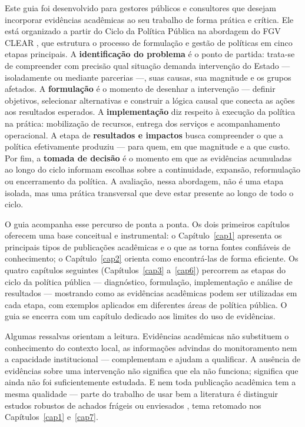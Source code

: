\documentclass[12pt, a4paper, openany]{book}
\begin{document}
Este guia foi desenvolvido para gestores públicos e consultores que desejam
incorporar evidências acadêmicas ao seu trabalho de forma prática e crítica.
Ele está organizado a partir do Ciclo da Política Pública na abordagem do FGV
CLEAR \citep{Lima2025}, que estrutura o processo de formulação e gestão de
políticas em cinco etapas principais. A \textbf{identificação do problema} é o
ponto de partida: trata-se de compreender com precisão qual situação demanda
intervenção do Estado --- isoladamente ou mediante parcerias ---, suas causas,
sua magnitude e os grupos afetados. A \textbf{formulação} é o momento de
desenhar a intervenção --- definir objetivos, selecionar alternativas e
construir a lógica causal que conecta as ações aos resultados esperados. A
\textbf{implementação} diz respeito à execução da política na prática:
mobilização de recursos, entrega dos serviços e acompanhamento operacional. A
etapa de \textbf{resultados e impactos} busca compreender o que a política
efetivamente produziu --- para quem, em que magnitude e a que custo. Por fim,
a \textbf{tomada de decisão} é o momento em que as evidências acumuladas ao
longo do ciclo informam escolhas sobre a continuidade, expansão, reformulação
ou encerramento da política. A avaliação, nessa abordagem, não é uma etapa
isolada, mas uma prática transversal que deve estar presente ao longo de todo
o ciclo.

O guia acompanha esse percurso de ponta a ponta. Os dois primeiros capítulos
oferecem uma base conceitual e instrumental: o Capítulo~\ref{cap1} apresenta os
principais tipos de publicações acadêmicas e o que as torna fontes confiáveis
de conhecimento; o Capítulo~\ref{cap2} orienta como encontrá-las de forma
eficiente. Os quatro capítulos seguintes (Capítulos~\ref{cap3} a~\ref{cap6})
percorrem as etapas do ciclo da política pública --- diagnóstico, formulação,
implementação e análise de resultados --- mostrando como as evidências
acadêmicas podem ser utilizadas em cada etapa, com exemplos aplicados em
diferentes áreas de política pública. O guia se encerra com um capítulo
dedicado aos limites do uso de evidências.

Algumas ressalvas orientam a leitura. Evidências acadêmicas não substituem o conhecimento do contexto local, as informações advindas do monitoramento nem a capacidade institucional --- complementam e ajudam a qualificar. A ausência de evidências sobre uma intervenção não significa que ela não funciona; significa que ainda não foi suficientemente estudada. E nem toda publicação acadêmica tem a mesma qualidade --- parte do trabalho de usar bem a literatura é distinguir estudos robustos de achados frágeis ou enviesados \citep{Parkhurst2017}, tema retomado nos Capítulos~\ref{cap1} e~\ref{cap7}.
\end{document}
